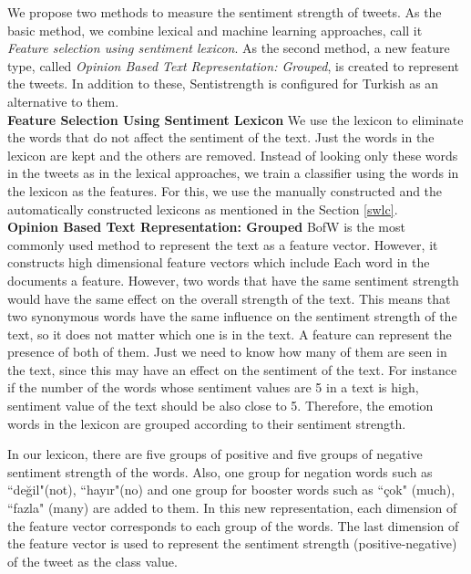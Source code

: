 \documentclass[12pt]{article}
\begin{document}
We propose two methods to measure the sentiment strength of tweets. As the basic method, we combine lexical and machine learning approaches, call it \textit{Feature selection using sentiment lexicon}. As the second method, a new feature type, called \textit{Opinion Based Text Representation: Grouped}, is created to represent the tweets. In addition to these, Sentistrength \cite{2} is configured for Turkish as an alternative to them.
\\ \newline
\textbf{Feature Selection Using Sentiment Lexicon}
 We use the lexicon to eliminate the words that do not affect the sentiment of the text. Just the words in the lexicon are kept and the others are removed. 
 Instead of looking only these words in the tweets as in the lexical approaches, we train a classifier using the words in the lexicon as the features.
 For this, we use the manually constructed and the automatically constructed lexicons as mentioned in the Section \ref{swlc}.\\ \newline
\textbf{Opinion Based Text Representation: Grouped}
BofW is the most commonly used method to represent the text as a feature vector. However, it constructs high dimensional feature vectors which include Each word in the documents a feature. However, two words that have the same sentiment strength would have the same effect on the overall strength of the text. This means that two synonymous words have the same influence on the sentiment strength of the text, so it does not matter which one is in the text. A feature can represent the presence of both of them. Just we need to know how many of them are seen in the text, since this may have an effect on the sentiment of the text. For instance if the number of the words whose sentiment values are 5 in a text is high, sentiment value of the text should be also close to 5. Therefore, the emotion words in the lexicon are grouped according to their sentiment strength. 

In our lexicon, there are five groups of positive and five groups of negative sentiment strength of the words. Also, one group for negation words such as ``de\u{g}il"(not), ``hay{\i}r"(no) and one group for booster words such as ``\c{c}ok" (much), ``fazla" (many) are added to them. In this new representation, each dimension of the feature vector corresponds to each group of the words. The last dimension of the feature vector is used to represent the sentiment strength (positive-negative) of the tweet as the class value.
\end{document}
